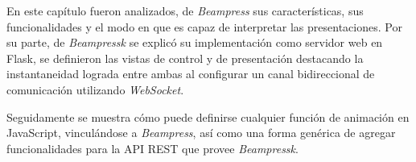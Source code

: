 			

	En este capítulo fueron analizados, de \textit{Beampress} sus características, sus funcionalidades y el modo en que es capaz de interpretar las presentaciones. Por su parte, de \textit{Beampressk} se explicó su implementación como servidor web en Flask, se definieron las vistas de control y de presentación destacando la instantaneidad lograda entre ambas al configurar un canal bidireccional de comunicación utilizando \textit{WebSocket}.

	Seguidamente se muestra cómo puede definirse cualquier función de animación en JavaScript, vinculándose a \textit{Beampress}, así como una forma genérica de agregar funcionalidades para la API REST que provee \textit{Beampressk}.
		
